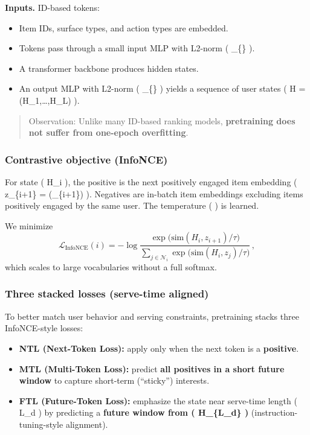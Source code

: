 \documentclass[
  letterpaper,
  DIV=11,
  numbers=noendperiod]{scrartcl}
\providecommand{\tightlist}{%
  \setlength{\itemsep}{0pt}\setlength{\parskip}{0pt}}
\begin{document}
\textbf{Inputs.} ID-based tokens:

\begin{itemize}
\tightlist
\item
  Item IDs, surface types, and action types are embedded.
\item
  Tokens pass through a small input MLP with L2-norm (
  \phi\_\{\} ).
\item
  A transformer backbone produces hidden states.
\item
  An output MLP with L2-norm ( \phi\_\{\} ) yields a sequence
  of user states ( H = (H\_1,\dots,H\_L) ).
\end{itemize}

\begin{quote}
Observation: Unlike many ID-based ranking models, \textbf{pretraining
does not suffer from one-epoch overfitting}.
\end{quote}

\subsubsection{Contrastive objective
(InfoNCE)}\label{contrastive-objective-infonce}

For state ( H\_i ), the positive is the next positively engaged item
embedding ( z\_\{i+1\} = (\_\{i+1\}) ). Negatives
are in-batch item embeddings excluding items positively engaged by the
same user. The temperature ( \tau ) is learned.

We minimize \[
\mathcal{L}_{\text{InfoNCE}}(i)
= - \log
\frac{\exp\!\big(\mathrm{sim}(H_i, z_{i+1})/\tau\big)}
{\sum\limits_{j \in \mathcal{N}_i}\exp\!\big(\mathrm{sim}(H_i, z_j)/\tau\big)} \, ,
\] which scales to large vocabularies without a full softmax.

\subsubsection{Three stacked losses (serve-time
aligned)}\label{three-stacked-losses-serve-time-aligned}

To better match user behavior and serving constraints, pretraining
stacks three InfoNCE-style losses:

\begin{itemize}
\tightlist
\item
  \textbf{NTL (Next-Token Loss):} apply only when the next token is a
  \textbf{positive}.
\item
  \textbf{MTL (Multi-Token Loss):} predict \textbf{all positives in a
  short future window} to capture short-term (``sticky'') interests.
\item
  \textbf{FTL (Future-Token Loss):} emphasize the state near serve-time
  length ( L\_d ) by predicting a \textbf{future window from (
  H\_\{L\_d\} )} (instruction-tuning-style alignment).
\end{itemize}
\end{document}
